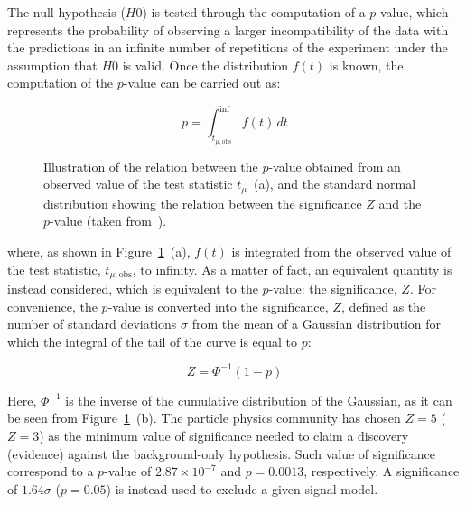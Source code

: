 			The null hypothesis ($H0$) is tested through the computation of a $p$-value, which represents the probability of observing a larger incompatibility of the data with the predictions in an infinite number of repetitions of the experiment under the assumption that $H0$ is valid. Once the distribution $f(t)$ is known, the computation of the $p$-value can be carried out as:

			\begin{equation}
				p = \int_{t_{\mu,\mathrm{obs}}}^{\inf} f(t)\,dt
 			\label{eq:pvalue}
			\end{equation}

			\begin{figure}[!htb]
				\centering
					\hspace{0.05\textwidth}
					\hspace{0.05\textwidth}
				\caption{Illustration of the relation between the $p$-value obtained from an observed value of the test statistic $t_{\mu}$~(a), and the standard normal distribution showing the relation between the significance $Z$ and the $p$-value (taken from~\cite{Cowan:2010js}).}
				\label{fig:pval-sig}
			\end{figure}

			\noindent where, as shown in Figure~\ref{fig:pval-sig}~(a), $f(t)$ is integrated from the observed value of the test statistic, $t_{\mu,\mathrm{obs}}$, to infinity. As a matter of fact, an equivalent quantity is instead considered, which is equivalent to the $p$-value: the significance, $Z$. For convenience, the $p$-value is converted into the significance, $Z$, defined as the number of standard deviations $\sigma$ from the mean of a Gaussian distribution for which the integral of the tail of the curve is equal to $p$: 

			\begin{equation}
				Z = \Phi^{-1} \left ( 1 - p \right )
			\label{eq:Z_pval}
			\end{equation}

			\noindent Here, $\Phi^{-1}$ is the inverse of the cumulative distribution of the Gaussian, as it can be seen from Figure~\ref{fig:pval-sig}~(b). The particle physics community has chosen $Z = 5$ ($Z=3$) as the minimum value of significance needed to claim a discovery (evidence) against the background-only hypothesis. Such value of significance correspond to a $p$-value of $2.87 \times 10^{-7}$ and $p = 0.0013$, respectively. A significance of $1.64\sigma$ ($p = 0.05$) is instead used to exclude a given signal model.


